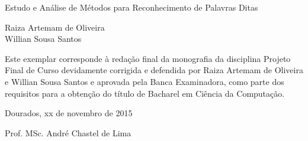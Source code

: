 \thispagestyle{empty}
\begin{center}

\Large{Estudo e Análise de Métodos para Reconhecimento de Palavras Ditas}

\vspace*{4cm}

\large{Raiza Artemam de Oliveira \\ Willian Sousa Santos }

\vspace*{4cm}

\end{center}
\begin{flushright}
\begin{minipage}{0.5\textwidth}
\normalsize{
Este exemplar corresponde à redação final
da monografia da disciplina Projeto Final de Curso 
devidamente corrigida e defendida por
 Raiza Artemam de Oliveira e Willian Sousa Santos
e aprovada pela Banca Examinadora, 
como parte dos requisitos para a obtenção
do título de Bacharel em Ciência da Computação.

\vspace*{2cm}

Dourados, xx de novembro de 2015

\vspace*{2cm}

Prof. MSc. André Chastel de Lima
}
\end{minipage}
\end{flushright}



